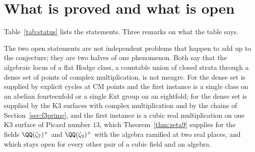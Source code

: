 \section{What is proved and what is open}\label{sec:status}


Table~\ref{tab:status} lists the statements. Three remarks on what the table says.

The two open statements are not independent problems that happen to add up to the conjecture; they are two halves of one phenomenon. Both say that the algebraic locus of a flat Hodge class, a countable union of closed strata through a dense set of points of complex multiplication, is not meagre. For \Fii{} the dense set is supplied by explicit cycles at CM points and the first instance is a single class on an abelian fourteenfold or a single Ext group on an eightfold; for \Fiii{} the dense set is supplied by the K3 surfaces with complex multiplication and by the chains of Section~\ref{sec:f3prime}, and the first instance is a cubic real multiplication on one K3 surface of Picard number $13$, which Theorem~\ref{thm:zeta9} supplies for the fields $\QQ(\zeta_{7})^{+}$ and $\QQ(\zeta_{9})^{+}$ with the algebra ramified at two real places, and which stays open for every other pair of a cubic field and an algebra.

